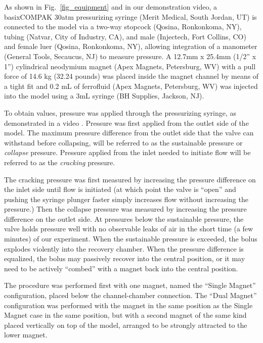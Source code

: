 \documentclass[]{asme2ej}
\begin{document}
As shown in Fig.~\ref{fig_equipment} and in our demonstration video\cite{stuckey2021video},
a basixCOMPAK 30atm pressurizing syringe (Merit Medical, South Jordan,
UT) is connected to the model via a two-way stopcock (Qosina,
Ronkonkoma, NY), tubing (Natvar, City of Industry, CA), and male
(Injectech, Fort Collins, CO) and female luer (Qosina, Ronkonkoma,
NY), allowing integration of a manometer (General Tools, Secaucus, NJ)
to measure pressure. A 12.7mm x 25.4mm (1/2” x 1”)
cylindrical neodymium magnet (Apex
Magnets, Petersburg, WV) with a pull force of 14.6 kg (32.24 pounds)
was placed inside the magnet channel by means
of a tight fit and 0.2 mL of ferrofluid (Apex Magnets, Petersburg, WV)
was injected into the model using a 3mL syringe (BH Supplies, Jackson,
NJ).

To obtain values, pressure was applied through the pressurizing
syringe, as demonstrated in a video \cite{stuckey2021video}.
Pressure was first applied from the outlet side of the model.
The maximum pressure difference from the outlet side that the
valve can withstand before collapsing, will be referred to as the
sustainable pressure or {\em collapse} pressure.
Pressure applied from the inlet needed to
initiate flow will be referred to as the {\em cracking} pressure.

The cracking pressure was first measured by increasing the pressure
difference on the inlet side until flow is initiated (at which point
the valve is ``open'' and
pushing the syringe plunger faster simply increases flow without
increasing the pressure.) Then the
collapse pressure was measured by increasing the pressure
difference on the outlet side. At pressures below the sustainable
pressure, the valve holds pressure well with no observable leaks of
air in the short time (a few minutes) of our experiment. When the
sustainable pressure is exceeded, the bolus explodes violently into
the recovery chamber. When the pressure difference is equalized, the
bolus may passively recover into the central position, or it may need
to be actively “combed” with a magnet back into the central position.

The procedure was performed first with one magnet, named the “Single
Magnet” configuration, placed below the channel-chamber connection.
The “Dual Magnet” configuration was performed with the magnet in the
same position as the Single Magnet case in the same position, but with
a second magnet of the same kind placed vertically on top of the model,
arranged to be strongly attracted to the lower magnet.
\end{document}
